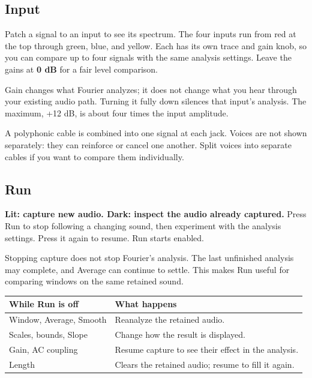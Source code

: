 \begingroup
\setlength{\parindent}{0pt}
\setlength{\parskip}{4pt}
\clearpage
\subsection{Input}

Patch a signal to an input to see its spectrum. The four inputs run from
red at the top through green, blue, and yellow. Each has its own trace and
gain knob, so you can compare up to four signals with the same analysis
settings. Leave the gains at \textbf{0 dB} for a fair level comparison.

Gain changes what Fourier analyzes; it does not change what you hear through
your existing audio path. Turning it fully down silences that input's
analysis. The maximum, +12 dB, is about four times the input amplitude.

A polyphonic cable is combined into one signal at each jack. Voices are not
shown separately: they can reinforce or cancel one another. Split voices
into separate cables if you want to compare them individually.

\subsection{Run}

\textbf{Lit: capture new audio. Dark: inspect the audio already captured.}
Press Run to stop following a changing sound, then experiment with the
analysis settings. Press it again to resume. Run starts enabled.

Stopping capture does not stop Fourier's analysis. The last unfinished
analysis may complete, and Average can continue to settle. This makes Run
useful for comparing windows on the same retained sound.

\begin{center}
\renewcommand{\arraystretch}{1.35}
\begin{tabularx}{\textwidth}{@{}p{}X@{}}
\toprule
\textbf{While Run is off} & \textbf{What happens} \\
\midrule
Window, Average, Smooth & Reanalyze the retained audio. \\
Scales, bounds, Slope & Change how the result is displayed. \\
Gain, AC coupling & Resume capture to see their effect in the analysis. \\
Length & Clears the retained audio; resume to fill it again. \\
\bottomrule
\end{tabularx}
\end{center}

